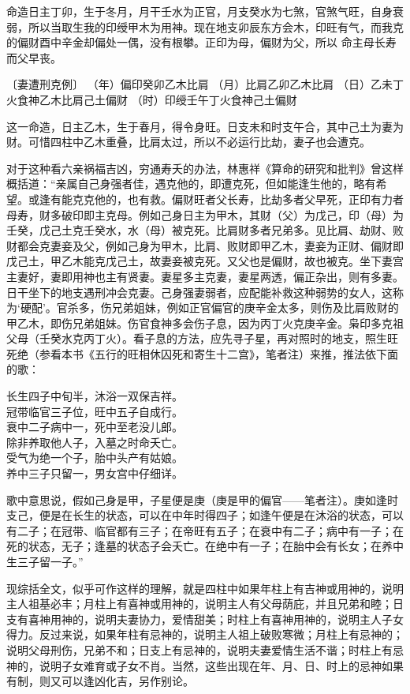 \documentclass[a5paper,oneside,12pt]{ctexbook}
\newenvironment{tightcenter}{%
  \setlength\topsep{0pt}
  \setlength\parskip{0pt}
  \begin{center}\kaishu 
}{%
  \end{center}
}
\begin{document}
命造日主丁卯，生于冬月，月干壬水为正官，月支癸水为七煞，官煞气旺，自身衰弱，所以当取生我的印绶甲木为用神。现在地支卯辰东方会木，印旺有气，而我克的偏财酉中辛金却偏处一偶，没有根攀。正印为母，偏财为父，所以
命主母长寿而父早丧。

〔妻遭刑克例〕
（年）偏印癸卯乙木比肩
（月）比肩乙卯乙木比肩
（日）乙未丁火食神乙木比肩己土偏财
（时）印绶壬午丁火食神己土偏财

这一命造，日主乙木，生于春月，得令身旺。日支未和时支午合，其中己土为妻为财。可惜四柱中乙木重叠，比肩太过，所以不必运行比劫，妻子也会遭克。

对于这种看六亲祸福吉凶，穷通寿夭的办法，林惠祥《算命的研究和批判》曾这样概括道：“亲属自己身强者佳，遇克他的，即遭克死，但如能逢生他的，略有希望。或逢有能克克他的，也有救。偏财旺者父长寿，比劫多者父早死，正印有力者母寿，财多破印即主克母。例如己身日主为甲木，其财（父）为戊己，印（母）为壬癸，戊己土克壬癸水，水（母）被克死。比肩财多者兄弟多。见比肩、劫财、败财都会克妻妾及父，例如己身为甲木，比肩、败财即甲乙木，妻妾为正财、偏财即戊己土，甲乙木能克戊己土，故妻妾被克死。又父也是偏财，故也被克。坐下妻宫主妻好，妻即用神也主有贤妻。妻星多主克妻，妻星两透，偏正杂出，则有多妻。日干坐下的地支遇刑冲会克妻。己身强妻弱者，应配能补救这种弱势的女人，这称为‘硬配’。官杀多，伤兄弟姐妹，例如正官偏官的庚辛金太多，则伤及比肩败财的甲乙木，即伤兄弟姐妹。伤官食神多会伤子息，因为丙丁火克庚辛金。枭印多克祖父母（壬癸水克丙丁火）。看子息的方法，应先寻子星，再对照时的地支，照生旺死绝（参看本书《五行的旺相休囚死和寄生十二宫》，笔者注）来推，推法依下面的歌：
\begin{tightcenter}
长生四子中旬半，沐浴一双保吉祥。\\
冠带临官三子位，旺中五子自成行。\\
衰中二子病中一，死中至老没儿郎。\\
除非养取他人子，入墓之时命夭亡。\\
受气为绝一个子，胎中头产有姑娘。\\
养中三子只留一，男女宫中仔细详。  
\end{tightcenter}

歌中意思说，假如己身是甲，子星便是庚（庚是甲的偏官——笔者注）。庚如逢时支己，便是在长生的状态，可以在中年时得四子；如逢午便是在沐浴的状态，可以有二子；在冠带、临官都有三子；在帝旺有五子；在衰中有二子；病中有一子；在死的状态，无子；逢墓的状态子会夭亡。在绝中有一子；在胎中会有长女；在养中生三子留一子。”

现综括全文，似乎可作这样的理解，就是四柱中如果年柱上有吉神或用神的，说明主人祖基必丰；月柱上有喜神或用神的，说明主人有父母荫庇，并且兄弟和睦；日支有喜神用神的，说明夫妻协力，爱情甜美；时柱上有喜神用神的，说明主人子女得力。反过来说，如果年柱有忌神的，说明主人祖上破败寒微；月柱上有忌神的；说明父母刑伤，兄弟不和；日支上有忌神的，说明夫妻爱情生活不谐；时柱上有忌神的，说明子女难育或子女不肖。当然，这些出现在年、月、日、时上的忌神如果有制，则又可以逢凶化吉，另作别论。
\end{document}

